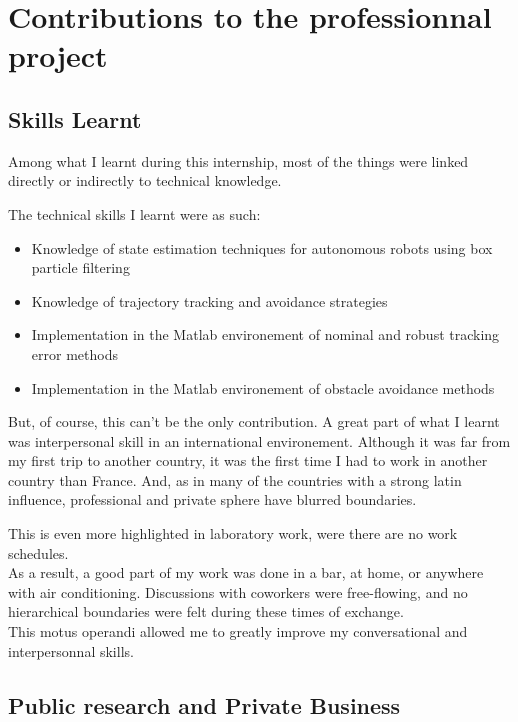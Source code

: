 \chapter{Contributions to the professionnal project}

\label{apport}


\section{Skills Learnt}
Among what I learnt during this internship, most of the things were linked directly or indirectly to technical knowledge.

The technical skills I learnt were as such:

\begin{itemize}
  \item Knowledge of state estimation techniques for autonomous robots using box particle filtering
  \item Knowledge of trajectory tracking and avoidance strategies
  \item Implementation in the Matlab environement of nominal and robust tracking error methods
  \item Implementation in the Matlab environement of obstacle avoidance methods
\end{itemize}

But, of course, this can't be the only contribution. A great part of what I learnt was interpersonal skill in an international environement.
Although it was far from my first trip to another country, it was the first time I had to work in another country than France.
And, as in many of the countries with a strong latin influence, professional and private sphere have blurred boundaries.

This is even more highlighted in laboratory work, were there are no work schedules.\\

As a result, a good part of my work was done in a bar, at home, or anywhere with air conditioning.
Discussions with coworkers were free-flowing, and no hierarchical boundaries were felt during these times of exchange.\\

This motus operandi allowed me to greatly improve my conversational and interpersonnal skills.

\section{Public research and Private Business}

